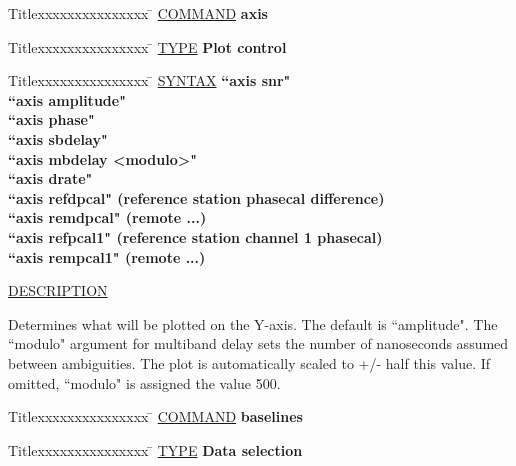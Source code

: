 \begin{tabbing}
Titlexxxxxxxxxxxxxxx \= \kill
\underline{COMMAND} \> {\bf 	axis} \\
\end{tabbing}

\begin{tabbing}
Titlexxxxxxxxxxxxxxx \= \kill
\underline{TYPE} \> {\bf 		Plot control} \\
\end{tabbing}

\begin{tabbing}
Titlexxxxxxxxxxxxxxx \= \kill
\underline{SYNTAX} \> {\bf 		``axis snr"} \\
\> {\bf 		``axis amplitude"} \\
\> {\bf 		``axis phase"} \\
\> {\bf 		``axis sbdelay"} \\
\> {\bf 		``axis mbdelay <modulo>"} \\
\> {\bf 		``axis drate"} \\
\> {\bf 		``axis refdpcal"    (reference station phasecal difference)} \\
\> {\bf 		``axis remdpcal"    (remote ...)} \\
\> {\bf 		``axis refpcal1"    (reference station channel 1 phasecal)} \\
\> {\bf 		``axis rempcal1"    (remote ...)} \\
\end{tabbing}

\underline{DESCRIPTION}
\begin{list}{}{\setlength{\leftmargin}{0.5in}
     \setlength{\rightmargin}{0in}}
\item
Determines what will be plotted on the Y-axis.  The default
is ``amplitude".  The ``modulo" argument for multiband delay sets
the number of nanoseconds assumed between ambiguities.  The
plot is automatically scaled to +/- half this value.  If omitted,
``modulo" is assigned the value 500.
\item
\end{list}
\vspace{.2in}

\begin{tabbing}
Titlexxxxxxxxxxxxxxx \= \kill
\underline{COMMAND} \> {\bf 	baselines} \\
\end{tabbing}

\begin{tabbing}
Titlexxxxxxxxxxxxxxx \= \kill
\underline{TYPE} \> {\bf 		Data selection} \\
\end{tabbing}

